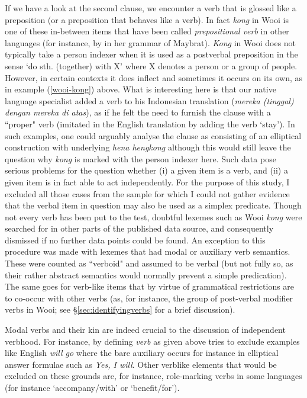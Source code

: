 If we have a look at the second clause, we encounter a verb that is glossed like a preposition (or a preposition that behaves like a verb). In fact \textit{kong} in Wooi is one of these in-between items that have been called \textit{prepositional verb} in other languages (for instance, by \citet{dol2007grammar} in her grammar of Maybrat). \textit{Kong} in Wooi does not typically take a person indexer when it is used as a postverbal preposition in the sense `do sth. (together) with X' where X denotes a person or a group of people. However, in certain contexts it does inflect and sometimes it occurs on its own, as in example (\ref{wooi-kong}) above. What is interesting here is that our native language specialist added a verb to his Indonesian translation (\textit{mereka (tinggal) dengan mereka di atas}), as if he felt the need to furnish the clause with a ``proper" verb (imitated in the English translation by adding the verb `stay'). In such examples, one could arguably analyse the clause as consisting of an elliptical construction with underlying \textit{hena hengkong} although this would still leave the question why \textit{kong} is marked with the person indexer here. Such data pose serious problems for the question whether (i) a given item is a verb, and (ii) a given item is in fact able to act independently. For the purpose of this study, I excluded all those cases from the sample for which I could not gather evidence that the verbal item in question may also be used as a simplex predicate. Though not every verb has been put to the test, doubtful lexemes such as Wooi \textit{kong} were searched for in other parts of the published data source, and consequently dismissed if no further data points could be found. An exception to this procedure was made with lexemes that had modal or auxiliary verb semantics. These were counted as ``verboid" and assumed to be verbal (but not fully so, as their rather abstract semantics would normally prevent a simple predication). The same goes for verb-like items that by virtue of grammatical restrictions are to co-occur with other verbs (as, for instance, the group of post-verbal modifier verbs in Wooi; see §\ref{sec:identifyingverbs} for a brief discussion).

Modal verbs and their kin are indeed crucial to the discussion of independent verbhood. For instance, by defining \textit{verb} as given above \citet{haspelmath2016serial} tries to exclude examples like English \textit{will go} where the bare auxiliary occurs for instance in elliptical answer formulae such as \textit{Yes, I will}. Other verblike elements that would be excluded on these grounds are, for instance, role-marking verbs in some languages (for instance `accompany/with' or `benefit/for'). 

